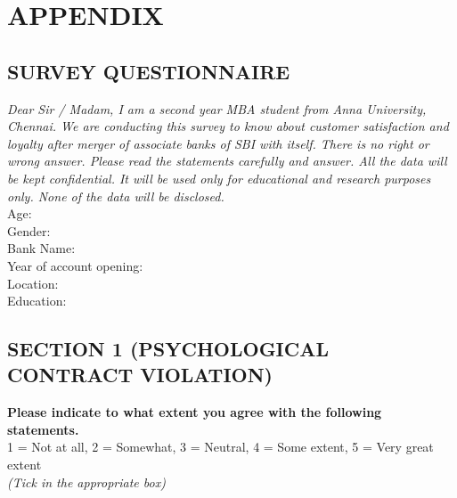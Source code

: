 \documentclass[a4paper, 12pt]{extarticle}
\begin{document}
{%

\newpage
\section{APPENDIX}
\subsection{SURVEY QUESTIONNAIRE}
\emph{Dear Sir / Madam, I am a second year MBA student from Anna University, Chennai. We are conducting this survey to know about customer satisfaction and loyalty after merger of associate banks of SBI with itself. There is no right or wrong answer. Please read the statements carefully and answer. All the data will be kept confidential. It will be used only for educational and research purposes only. None of the data will be disclosed.}\\
\noindent\makebox[\linewidth]{\rule{\paperwidth}{0.4pt}}
Age:\\
Gender:\\
Bank Name:\\
Year of account opening:\\
Location:\\
Education:\\
\noindent\makebox[\linewidth]{\rule{\paperwidth}{0.4pt}}

\subsection*{SECTION 1 (PSYCHOLOGICAL CONTRACT VIOLATION)}
\textbf{Please indicate to what extent you agree with the following statements.} \\
1 = Not at all, 2 = Somewhat, 3 = Neutral, 4 = Some extent, 5 = Very great extent\\
\emph {(Tick in the appropriate box)}\\
\begin{minipage}{\textwidth}


\end{minipage}}
\end{document}
